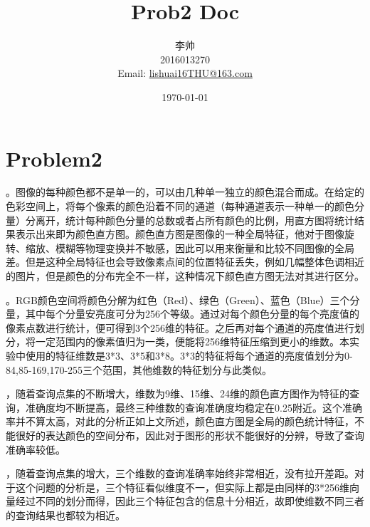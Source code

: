 \documentclass[UTF8]{ctexart}
\title{Prob2 Doc}
\author{李帅\\2016013270\\Email: \href{mailto:lishuai16THU@163.com}{lishuai16THU@163.com}}
\date{\today}
\begin{document}
  \maketitle
  \section*{Problem2}
  。图像的每种颜色都不是单一的，可以由几种单一独立的颜色混合而成。在给定的色彩空间上，将每个像素的颜色沿着不同的通道（每种通道表示一种单一的颜色分量）分离开，统计每种颜色分量的总数或者占所有颜色的比例，用直方图将统计结果表示出来即为颜色直方图。颜色直方图是图像的一种全局特征，他对于图像旋转、缩放、模糊等物理变换并不敏感，因此可以用来衡量和比较不同图像的全局差。但是这种全局特征也会导致像素点间的位置特征丢失，例如几幅整体色调相近的图片，但是颜色的分布完全不一样，这种情况下颜色直方图无法对其进行区分。

  。RGB颜色空间将颜色分解为红色（Red）、绿色（Green）、蓝色（Blue）三个分量，其中每个分量安亮度可分为256个等级。通过对每个颜色分量的每个亮度值的像素点数进行统计，便可得到3个256维的特征。之后再对每个通道的亮度值进行划分，将一定范围内的像素值归为一类，便能将256维特征压缩到更小的维数。本实验中使用的特征维数是3*3、3*5和3*8。3*3的特征将每个通道的亮度值划分为0-84,85-169,170-255三个范围，其他维数的特征划分与此类似。

  ，随着查询点集的不断增大，维数为9维、15维、24维的颜色直方图作为特征的查询，准确度均不断提高，最终三种维数的查询准确度均稳定在0.25附近。这个准确率并不算太高，对此的分析正如上文所述，颜色直方图是全局的颜色统计特征，不能很好的表达颜色的空间分布，因此对于图形的形状不能很好的分辨，导致了查询准确率较低。

  ，随着查询点集的增大，三个维数的查询准确率始终非常相近，没有拉开差距。对于这个问题的分析是，三个特征看似维度不一，但实际上都是由同样的3*256维向量经过不同的划分而得，因此三个特征包含的信息十分相近，故即使维数不同三者的查询结果也都较为相近。
\end{document}
